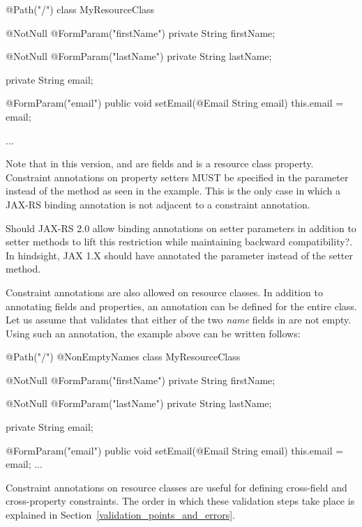 \begin{listing}{1}
@Path("/")
class MyResourceClass {

    @NotNull @FormParam("firstName")
    private String firstName;

    @NotNull @FormParam("lastName")
    private String lastName;

    private String email;

    @FormParam("email")
    public void setEmail(@Email String email) {
        this.email = email;
    }

    ...
}
\end{listing}

Note that in this version,  and  are fields and  is a resource class property. Constraint annotations on property setters MUST be specified in the parameter instead of the method as seen in the example. This is the only case in which a JAX-RS binding annotation is not adjacent to a constraint annotation. 

\begin{ednote}
Should JAX-RS 2.0 allow binding annotations on setter parameters in addition to setter methods to lift this restriction while maintaining backward compatibility?. In hindsight, JAX 1.X should have annotated the parameter instead of the setter method.
\end{ednote}

Constraint annotations are also allowed on resource classes. In addition to annotating fields and properties, an annotation can be defined for the entire class. Let us assume that  validates that either of the two \emph{name} fields in  are not empty. Using such an annotation, the example above can be written follows:

\begin{listing}{1}
@Path("/")
@NonEmptyNames
class MyResourceClass {

    @NotNull @FormParam("firstName")
    private String firstName;

    @NotNull @FormParam("lastName")
    private String lastName;

    private String email;

    @FormParam("email")
    public void setEmail(@Email String email) {
        this.email = email;
    }
    ...
}
\end{listing}

Constraint annotations on resource classes are useful for defining cross-field and cross-property constraints. The order in which these validation steps take place is explained in Section~\ref{validation_points_and_errors}.


